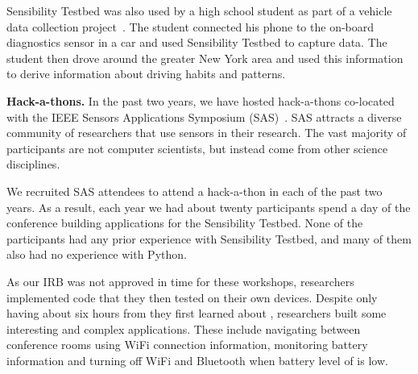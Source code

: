 Sensibility Testbed was also used by a high school student as part of 
a vehicle data collection project~\cite{reininger2015first}.  The student
connected his phone to the on-board diagnostics sensor in a car and used Sensibility
Testbed to capture data.  The student then drove around the greater
New York area and used this information to derive information about driving
habits and patterns. 


{\bf Hack-a-thons.}  In the past two years, we have hosted 
hack-a-thons co-located with 
the IEEE Sensors Applications Symposium (SAS)~\cite{sas}.  SAS attracts a 
diverse community of researchers that use sensors in their research.
The vast majority of participants are not computer scientists, but instead
come from other science disciplines.

We recruited SAS attendees to attend a hack-a-thon in each of the past two
years.  As a result, each year we had about twenty participants
spend a day of the conference building applications for the Sensibility Testbed.
None of the participants had any prior experience with 
Sensibility Testbed, and many of them also had no experience with Python.

As our IRB was not approved in time for these workshops, 
researchers implemented code that they then tested on their own devices.
%
Despite only having about six hours from they first learned about \sysname, 
researchers built some interesting and complex applications. These include 
navigating between conference rooms using WiFi connection information, 
monitoring battery information and turning off WiFi and Bluetooth when 
battery level of is low.



